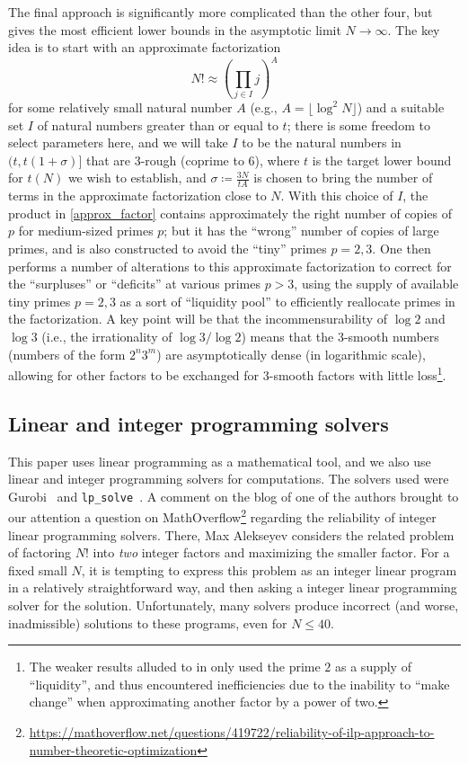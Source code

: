 \documentclass[10pt,a4paper,reqno]{amsart}
\numberwithin{equation}{section}
\theoremstyle{plain}
\theoremstyle{definition}
\begin{document}
The final approach is significantly more complicated than the other four, but gives the most efficient lower bounds in the asymptotic limit $N \to \infty$.  The key idea is to start with an approximate factorization
\begin{equation}\label{approx_factor}
   N! \approx \left(\prod_{j \in I} j\right)^A
\end{equation}
for some relatively small natural number $A$ (e.g., $A = \lfloor \log^2 N \rfloor$) and a suitable set $I$ of natural numbers greater than or equal to $t$; there is some freedom to select parameters here, and we will take $I$ to be the natural numbers in $(t, t(1+\sigma)]$ that are $3$-rough (coprime to $6$), where $t$ is the target lower bound for $t(N)$ we wish to establish, and $\sigma \coloneqq \frac{3N}{tA}$ is chosen to bring the number of terms in the approximate factorization close to $N$.  With this choice of $I$, the product in \eqref{approx_factor} contains approximately the right number of copies of $p$ for medium-sized primes $p$; but it has the ``wrong'' number of copies of large primes, and is also constructed to avoid the ``tiny'' primes $p=2,3$.  One then performs a number of alterations to this approximate factorization to correct for the ``surpluses'' or ``deficits'' at various primes $p>3$, using the supply of available tiny primes $p=2,3$ as a sort of ``liquidity pool'' to efficiently reallocate primes in the factorization.  A key point will be that the incommensurability of $\log 2$ and $\log 3$ (i.e., the irrationality of $\log 3/\log 2$) means that the $3$-smooth numbers (numbers of the form $2^n 3^m$) are asymptotically dense (in logarithmic scale), allowing for other factors to be exchanged for $3$-smooth factors with little loss\footnote{The weaker results alluded to in  only used the prime $2$ as a supply of ``liquidity'', and thus encountered inefficiencies due to the inability to ``make change'' when approximating another factor by a power of two.}.

\subsection{Linear and integer programming solvers}

This paper uses linear programming as a mathematical tool, and we also use linear and integer programming solvers for computations.
The solvers used were Gurobi~\cite{gurobi} and \texttt{lp\_solve}~\cite{lpsolve}.
A comment on the blog of one of the authors brought to our attention a question on MathOverflow\footnote{\url{https://mathoverflow.net/questions/419722/reliability-of-ilp-approach-to-number-theoretic-optimization}} regarding the reliability of integer linear programming solvers.
There, Max Alekseyev considers the related problem of factoring $N!$ into \emph{two} integer factors and maximizing the smaller factor.
For a fixed small $N$, it is tempting to express this problem as an integer linear program in a relatively straightforward way, and then asking a integer linear programming solver for the solution.
Unfortunately, many solvers produce incorrect (and worse, inadmissible) solutions to these programs, even for $N\le 40$.
\end{document}
